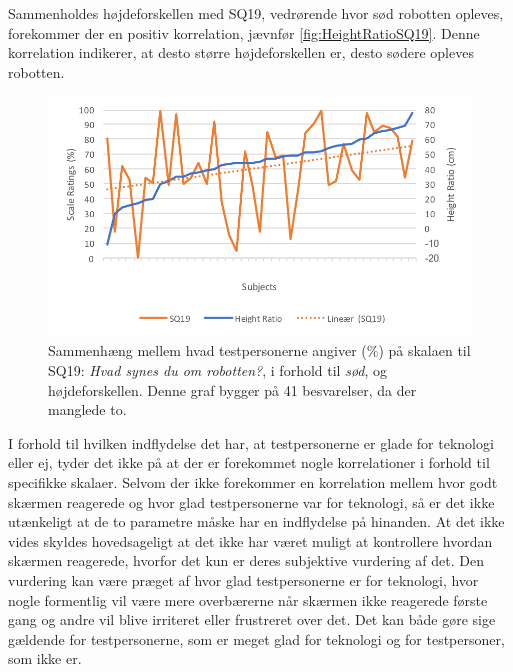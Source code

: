 \noindent
%
Sammenholdes højdeforskellen med SQ19, vedrørende hvor sød robotten opleves, forekommer der en positiv korrelation, jævnfør \autoref{fig:HeightRatioSQ19}. Denne korrelation indikerer, at desto større højdeforskellen er, desto sødere opleves robotten. 
%
\begin{figure}[H]
\centering
\includegraphics[width=\textwidth]{Figure/DatabehandlingSkalaer/Demografi/HeightRatioSQ19}
\caption{Sammenhæng mellem hvad testpersonerne angiver (\%) på skalaen til SQ19: \textit{Hvad synes du om robotten?}, i forhold til \textit{sød}, og højdeforskellen. Denne graf bygger på 41 besvarelser, da der manglede to.}
\label{fig:HeightRatioSQ19}
\end{figure}
\noindent
%
I forhold til hvilken indflydelse det har, at testpersonerne er glade for teknologi eller ej, tyder det ikke på at der er forekommet nogle korrelationer i forhold til specifikke skalaer. Selvom der ikke forekommer en korrelation mellem hvor godt skærmen reagerede og hvor glad testpersonerne var for teknologi, så er det ikke utænkeligt at de to parametre måske har en indflydelse på hinanden. At det ikke vides skyldes hovedsageligt at det ikke har været muligt at kontrollere hvordan skærmen reagerede, hvorfor det kun er deres subjektive vurdering af det. Den vurdering kan være præget af hvor glad testpersonerne er for teknologi, hvor nogle formentlig vil være mere overbærerne når skærmen ikke reagerede første gang og andre vil blive irriteret eller frustreret over det. Det kan både gøre sige gældende for testpersonerne, som er meget glad for teknologi og for testpersoner, som ikke er. 
